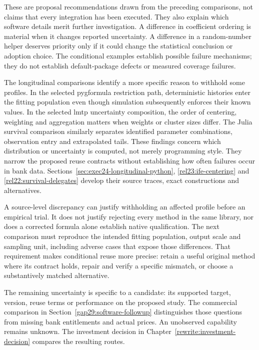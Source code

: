 These are proposal recommendations drawn from the preceding comparisons, not
claims that every integration has been executed. They also explain which
software details merit further investigation. A difference in coefficient
ordering is material when it changes reported uncertainty. A difference in a
random-number helper deserves priority only if it could change the statistical
conclusion or adoption choice. The conditional examples establish possible
failure mechanisms; they do not establish default-package defects or measured
coverage failures.~\citep{exec29_panel_inference_sources,exec29_panel_runtime_reference}

The longitudinal comparisons identify a more specific reason to withhold
some profiles. In the selected pygformula restriction path, deterministic
histories enter the fitting population even though simulation subsequently
enforces their known values. In the selected lmtp uncertainty composition,
the order of centering, weighting and aggregation matters when weights or
cluster sizes differ. The Julia survival comparison similarly separates
identified parameter combinations, observation entry and extrapolated tails.
These findings concern which distribution or uncertainty is computed, not
merely programming style. They narrow the proposed reuse contracts without
establishing how often failures occur in bank data.
Sections~\ref{sec:exec24-longitudinal-python}, \ref{rel23:ife-centering} and
\ref{rel22:survival-delegates} develop their source traces, exact constructions
and alternatives.~\citep{rel25pygfit,rel23ife,rel23ifecaller,rel22survbase,rel22survdist,rel22survcaller}

A source-level discrepancy can justify withholding an affected profile before
an empirical trial. It does not justify rejecting every method in the same
library, nor does a corrected formula alone establish native qualification.
The next comparison must reproduce the intended fitting population, output
scale and sampling unit, including adverse cases that expose those differences.
That requirement makes conditional reuse more precise: retain a useful original
method where its contract holds, repair and verify a specific mismatch, or
choose a substantively matched alternative.

The remaining uncertainty is specific to a candidate: its supported target,
version, reuse terms or performance on the proposed study. The commercial
comparison in Section~\ref{gap29:software-followup} distinguishes those
questions from missing bank entitlements and actual prices. An unobserved
capability remains unknown. The investment decision in
Chapter~\ref{rewrite:investment-decision} compares the resulting routes.
